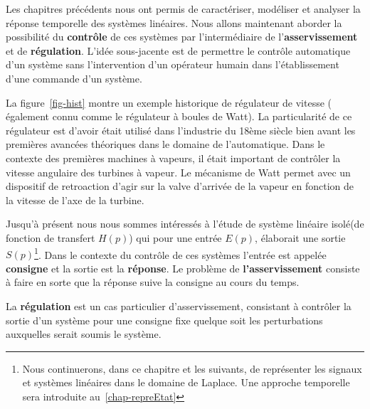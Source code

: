 Les chapitres précédents nous ont permis de caractériser, modéliser et
analyser la réponse temporelle des systèmes linéaires.
Nous allons maintenant aborder la possibilité du \textbf{contrôle} de ces 
systèmes par l'intermédiaire de l'\textbf{asservissement} et de 
\textbf{régulation}. 
L'idée sous-jacente est de permettre le contrôle automatique d'un système
sans l'intervention d'un opérateur humain dans l'établissement d'une commande
d'un système. 

La figure~\ref{fig-hist} montre un exemple historique de régulateur de 
vitesse ( également connu comme le régulateur à boules de Watt). 
La particularité de ce régulateur est d'avoir était utilisé dans l'industrie
du 18ème siècle bien avant les premières avancées théoriques dans le domaine 
de l'automatique. Dans le contexte des premières machines à vapeurs, 
il était important de contrôler la vitesse angulaire des turbines à vapeur. 
Le mécanisme de Watt permet avec un dispositif de retroaction d'agir sur la 
valve d'arrivée de la vapeur en fonction de la vitesse de l'axe de la turbine.

\clearpage
Jusqu'à présent nous nous sommes intéressés à l'étude de système 
linéaire \og isolé\fg (de fonction de transfert $H(p)$) 
qui pour une entrée $E(p)$, élaborait une sortie $S(p)$\footnote{Nous
continuerons, dans ce chapitre et les suivants, de représenter 
les signaux et systèmes linéaires dans le domaine de Laplace. Une approche temporelle
sera introduite au~\cref{chap-repreEtat}}.
Dans le contexte du contrôle de ces systèmes l'entrée est appelée 
\textbf{consigne} et la sortie est la \textbf{réponse}. Le problème de 
\textbf{l'asservissement} consiste à faire en sorte que la réponse suive 
la consigne au cours du temps.

La \textbf{régulation} est un cas particulier d'asservissement, consistant
à contrôler la sortie d'un système pour une consigne fixe quelque soit 
les perturbations auxquelles serait soumis le système.

%                                      
%                                      
%
\begin{center}
\end{center}

